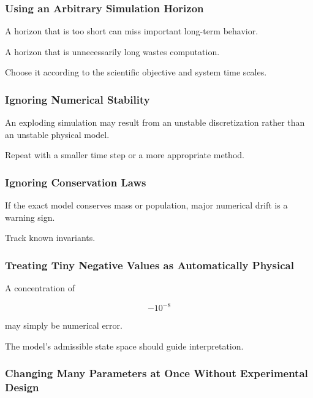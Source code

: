 \subsubsection{Using an Arbitrary Simulation Horizon}

A horizon that is too short can miss important long-term behavior.

A horizon that is unnecessarily long wastes computation.

Choose it according to the scientific objective and system time scales.

\subsubsection{Ignoring Numerical Stability}

An exploding simulation may result from an unstable discretization rather
than an unstable physical model.

Repeat with a smaller time step or a more appropriate method.

\subsubsection{Ignoring Conservation Laws}

If the exact model conserves mass or population, major numerical drift is
a warning sign.

Track known invariants.

\subsubsection{Treating Tiny Negative Values as Automatically Physical}

A concentration of

\[
-10^{-8}
\]

may simply be numerical error.

The model's admissible state space should guide interpretation.

\subsubsection{Changing Many Parameters at Once Without Experimental Design}

